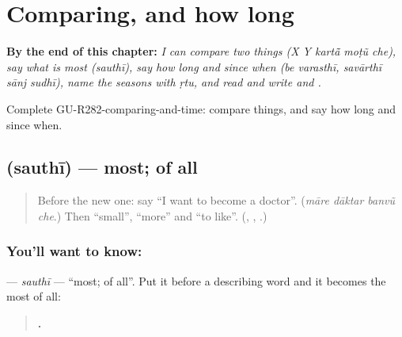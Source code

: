 
\chapter{Comparing, and how long}
\label{ch:gu-comparing-and-how-long}

\begin{chapteropening}
\textbf{By the end of this chapter:} \emph{I can compare two things (X Y kartā̃ moṭũ che), say what is most (sauthī), say how long and since when (be varasthī, savārthī sānj sudhī), name the seasons with ṛtu, and read and write  and .}

Complete GU-R282-comparing-and-time: compare things, and say how long and since when.
\end{chapteropening}

\section[\texorpdfstring{\gu{સૌથી} (sauthī)}{સૌથી (sauthī)}]{ (sauthī) — most; of all}

\label{lesson:GU-C282-sauthi}



\begin{quote}
Before the new one: say \textquotedblleft{}I want to become a doctor\textquotedblright{}. (\emph{māre dāktar banvũ che}.) Then \textquotedblleft{}small\textquotedblright{}, \textquotedblleft{}more\textquotedblright{} and \textquotedblleft{}to like\textquotedblright{}. (\textbf{}, \textbf{}, \textbf{}.)
\end{quote}

\subsection*{You'll want to know: }
\textbf{} — \emph{sauthī} — \textquotedblleft{}most; of all\textquotedblright{}. Put it before a describing word and it becomes the most of all:

\begin{quote}
\textbf{   .}
\end{quote}


